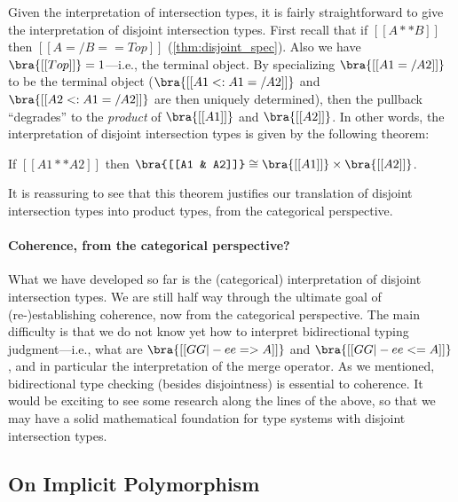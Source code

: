 Given the interpretation of intersection types, it is fairly straightforward to
give the interpretation of disjoint intersection types. First recall that if
$[[A ** B]]$ then $[[ A =/ B == Top ]]$ (\cref{thm:disjoint_spec}). Also we have
$\bra{[[Top]]} = 1$---i.e., the terminal object. By specializing $\bra{[[A1 =/ A2]]}$ to be the terminal object
($\bra{[[A1 <: A1 =/ A2]]}$ and $\bra{[[A2 <: A1 =/ A2]]}$ are then uniquely
determined), then the pullback ``degrades'' to the \textit{product} of
$\bra{[[A1]]}$ and $\bra{[[A2]]}$. In other words, the interpretation of
disjoint intersection types is given by the following theorem:
\begin{theorem}
  If $[[A1 ** A2]]$ then $\bra{[[A1 & A2]]} \cong \bra{[[A1]]} \times \bra{[[A2]]} $.
\end{theorem}
\begin{remark}
It is reassuring to see that this theorem justifies our translation of
disjoint intersection types into product types, from the categorical
perspective.
\end{remark}



\paragraph{Coherence, from the categorical perspective?}

What we have developed so far is the (categorical) interpretation of disjoint intersection
types. We are still half way through the ultimate goal of (re-)establishing
coherence, now from the categorical perspective. The main difficulty is that we
do not know yet how to interpret bidirectional typing judgment---i.e., what are
$\bra{[[GG |- ee => A]]}$ and $\bra{[[GG |- ee <= A]]}$, and in particular the
interpretation of the merge operator. As we mentioned, bidirectional type checking
(besides disjointness) is essential to coherence. It would be exciting to see
some research along the lines of the above, so that we may have a solid
mathematical foundation for type systems with disjoint intersection types.

\subsection{On Implicit Polymorphism}
\label{sec:implicit}

